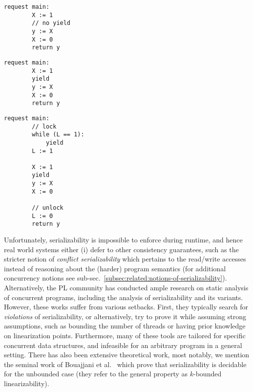 \noindent
\begin{minipage}[t]{0.45\textwidth}
	\begin{minipage}[t]{\textwidth}
		\begin{lstlisting}[caption={Without yield or lock (serializable)},
			label={lst:MotivatingExample1Ser}]
    request main: 
        X := 1 
        // no yield
        y := X 
        X := 0
        return y 
		\end{lstlisting}
	\end{minipage}
	\vspace{1em}
	\begin{minipage}[t]{\textwidth}
		\begin{lstlisting}[caption={With yield (not serializable)},
			label={lst:MotivatingExample2NonSer}]
    request main: 
        X := 1 
        yield 
        y := X 
        X := 0
        return y 	
		\end{lstlisting}
	\end{minipage}
\end{minipage}%
\hfill
\begin{minipage}[t]{0.45\textwidth}
	\begin{lstlisting}[caption={With yield and lock (serializable)},
		label={lst:MotivatingExample3Ser}]
    request main: 
        // lock
        while (L == 1): 
            yield
        L := 1 

        X := 1
        yield
        y := X 
        X := 0

        // unlock    
        L := 0
        return y 
	\end{lstlisting}
\end{minipage}



Unfortunately, serializability is impossible to enforce during runtime, and hence real world systems either (i) defer to other consistency guarantees, such as the stricter notion of \textit{conflict serializability} which pertains to the read/write accesses instead of reasoning about the (harder) program semantics (for additional concurrency notions see sub-sec.~\ref{subsec:related:notions-of-serializability}). Alternatively, the PL community has conducted ample research on static analysis of concurrent programs, including the analysis of serializability and its variants. However, these works suffer from various setbacks. First, they typically search for \textit{violations} of serializability, or alternatively, try to prove it while assuming strong assumptions, such as bounding the number of threads or having prior knowledge on linearization points.
Furthermore, many of these tools are tailored for specific concurrent data structures, and infeasible for an arbitrary program in a general setting.
%
There has also been extensive theoretical work, most notably, we mention the seminal work of Bouajjani et al.~\cite{BoEmEnHa13} which prove that serializability is decidable for the unbounded case (they refer to the general property as $k$-bounded linearizability).



